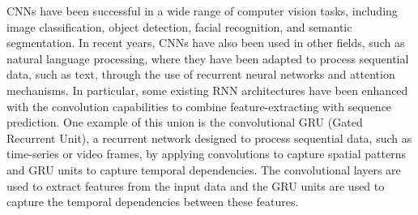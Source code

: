 \documentclass{article}
\begin{document}
CNNs have been successful in a wide range of computer vision tasks, including image classification, object detection, facial recognition, and semantic segmentation. In recent years, CNNs have also been used in other fields, such as natural language processing, where they have been adapted to process sequential data, such as text, through the use of recurrent neural networks and attention mechanisms. In particular, some existing RNN architectures have been enhanced with the convolution capabilities to combine feature-extracting with sequence prediction. One example of this union is the convolutional GRU (Gated Recurrent Unit), a recurrent network designed to process sequential data, such as time-series or video frames, by applying convolutions to capture spatial patterns and GRU units to capture temporal dependencies. The convolutional layers are used to extract features from the input data and the GRU units are used to capture the temporal dependencies between these features.



\clearpage
\end{document}
